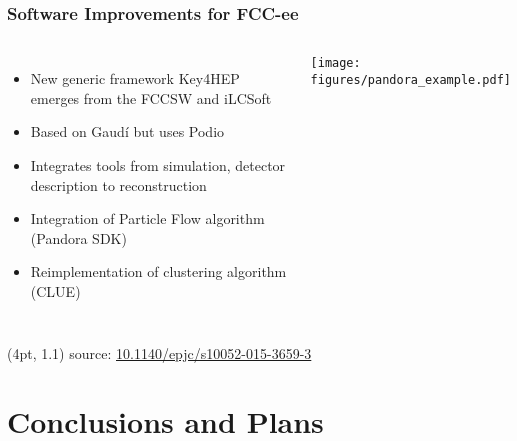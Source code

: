 \documentclass[aspectratio=169]{beamer}
\begin{document}
\begin{frame}
  \frametitle{Software Improvements for FCC-ee}

  \begin{columns}[c]
    \begin{itemize}
      \item New generic framework Key4HEP emerges from the FCCSW and iLCSoft
      \item Based on Gaudí but uses Podio
      \item Integrates tools from simulation, detector description to
            reconstruction
      \item Integration of Particle Flow algorithm (Pandora SDK)
      \item Reimplementation of clustering algorithm (CLUE)
    \end{itemize}

    \begin{center}
      \texttt{[image: figures/pandora\_example.pdf]}
    \end{center}
  \end{columns}

  \begin{textblock*}{\paperwidth}(4pt, 1.1\textheight)
    \tiny source:
    \href{https://doi.org/10.1140/epjc/s10052-015-3659-3}
         {10.1140/epjc/s10052-015-3659-3}
  \end{textblock*}
\end{frame}

%
%
\section{Conclusions and Plans}
\end{document}
